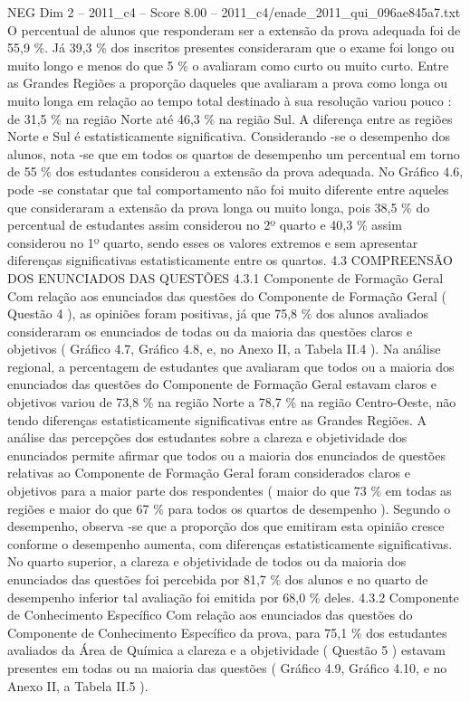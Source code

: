 \begin{textsample}{NEG Dim 2 – 2011\_c4 – Score 8.00 – 2011\_c4/enade\_2011\_qui\_096ae845a7.txt}
O percentual de alunos que responderam ser a extensão da prova adequada foi de 55,9 \%.
Já 39,3 \% dos inscritos presentes consideraram que o exame foi longo ou muito longo e menos do que 5 \% o avaliaram como curto ou muito curto.
Entre as Grandes Regiões a proporção daqueles que avaliaram a prova como longa ou muito longa em relação ao tempo total destinado à sua resolução variou pouco : de 31,5 \% na região Norte até 46,3 \% na região Sul.
A diferença entre as regiões Norte e Sul é estatisticamente significativa.
Considerando -se o desempenho dos alunos, nota -se que em todos os quartos de desempenho um percentual em torno de 55 \% dos estudantes considerou a extensão da prova adequada.
No Gráfico 4.6, pode -se constatar que tal comportamento não foi muito diferente entre aqueles que consideraram a extensão da prova longa ou muito longa, pois 38,5 \% do percentual de estudantes assim considerou no 2º quarto e 40,3 \% assim considerou no 1º quarto, sendo esses os valores extremos e sem apresentar diferenças significativas estatisticamente entre os quartos. 4.3 COMPREENSÃO DOS ENUNCIADOS DAS QUESTÕES 4.3.1 Componente de Formação Geral Com relação aos enunciados das questões do Componente de Formação Geral ( Questão 4 ), as opiniões foram positivas, já que 75,8 \% dos alunos avaliados consideraram os enunciados de todas ou da maioria das questões claros e objetivos ( Gráfico 4.7, Gráfico 4.8, e, no Anexo II, a Tabela II.4 ).
Na análise regional, a percentagem de estudantes que avaliaram que todos ou a maioria dos enunciados das questões do Componente de Formação Geral estavam claros e objetivos variou de 73,8 \% na região Norte a 78,7 \% na região Centro-Oeste, não tendo diferenças estatisticamente significativas entre as Grandes Regiões.
A análise das percepções dos estudantes sobre a clareza e objetividade dos enunciados permite afirmar que todos ou a maioria dos enunciados de questões relativas ao Componente de Formação Geral foram considerados claros e objetivos para a maior parte dos respondentes ( maior do que 73 \% em todas as regiões e maior do que 67 \% para todos os quartos de desempenho ).
Segundo o desempenho, observa -se que a proporção dos que emitiram esta opinião cresce conforme o desempenho aumenta, com diferenças estatisticamente significativas.
No quarto superior, a clareza e objetividade de todos ou da maioria dos enunciados das questões foi percebida por 81,7 \% dos alunos e no quarto de desempenho inferior tal avaliação foi emitida por 68,0 \% deles. 4.3.2 Componente de Conhecimento Específico Com relação aos enunciados das questões do Componente de Conhecimento Específico da prova, para 75,1 \% dos estudantes avaliados da Área de Química a clareza e a objetividade ( Questão 5 ) estavam presentes em todas ou na maioria das questões ( Gráfico 4.9, Gráfico 4.10, e no Anexo II, a Tabela II.5 ).

\end{textsample}
